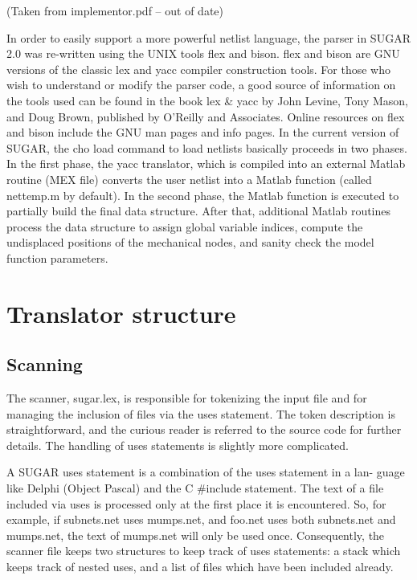 

(Taken from implementor.pdf -- out of date)

In order to easily support a more powerful netlist language, the parser in
SUGAR 2.0 was re-written using the UNIX tools flex and bison. flex and
bison are GNU versions of the classic lex and yacc compiler construction tools.
For those who wish to understand or modify the parser code, a good source of
information on the tools used can be found in the book lex \& yacc by John
Levine, Tony Mason, and Doug Brown, published by O'Reilly and Associates.
Online resources on flex and bison include the GNU man pages and info pages.
   In the current version of SUGAR, the cho load command to load netlists
basically proceeds in two phases. In the first phase, the yacc translator, which
is compiled into an external Matlab routine (MEX file) converts the user netlist
into a Matlab function (called nettemp.m by default). In the second phase, the
Matlab function is executed to partially build the final data structure. After
that, additional Matlab routines process the data structure to assign global
variable indices, compute the undisplaced positions of the mechanical nodes,
and sanity check the model function parameters.

\section{Translator structure}


\subsection{Scanning}

The scanner, sugar.lex, is responsible for tokenizing the input file and for
managing the inclusion of files via the uses statement. The token description
is straightforward, and the curious reader is referred to the source code for
further details. The handling of uses statements is slightly more complicated.

A SUGAR uses statement is a combination of the uses statement in a lan- guage
like Delphi (Object Pascal) and the C \#include statement. The text of a file
included via uses is processed only at the first place it is encountered. So,
for example, if subnets.net uses mumps.net, and foo.net uses both subnets.net
and mumps.net, the text of mumps.net will only be used once. Consequently, the
scanner file keeps two structures to keep track of uses statements: a stack
which keeps track of nested uses, and a list of files which have been included
already.

